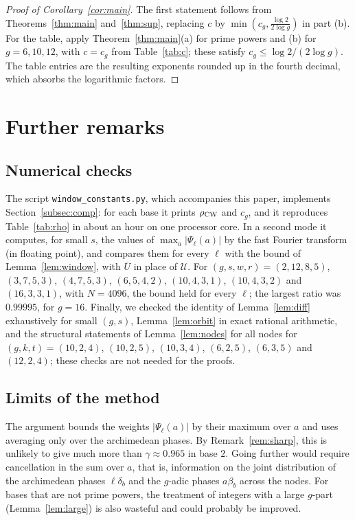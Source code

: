 \documentclass[11pt]{amsart}
\theoremstyle{definition}
\numberwithin{equation}{section}
\newcommand{\cU}{\mathcal{U}}
\begin{document}
\begin{proof}[Proof of Corollary~\ref{cor:main}]
The first statement follows from Theorems~\ref{thm:main} and~\ref{thm:sup},
replacing $c$ by $\min(c_g,\frac{\log2}{2\log g})$ in part (b). For the
table, apply Theorem~\ref{thm:main}(a) for prime powers and (b) for $g=6,10,12$,
with $c=c_g$ from Table~\ref{tab:c}; these satisfy
$c_g\le\log2/(2\log g)$. The table entries are the resulting exponents
rounded up in the fourth decimal, which absorbs the logarithmic factors.
\end{proof}

\section{Further remarks}\label{sec:remarks}

\subsection{Numerical checks}\label{subsec:checks}
The script \texttt{window\_constants.py}, which accompanies this paper,
implements Section~\ref{subsec:comp}: for each base it prints
$\rho_{\rm CW}$ and $c_g$, and it reproduces Table~\ref{tab:rho} in about
an hour on one processor core. In a second mode it computes, for
small $s$, the values of $\max_a|\Psi_\ell(a)|$ by the fast Fourier
transform (in floating point), and compares them for every $\ell$ with the bound of
Lemma~\ref{lem:window}, with $\overline U$ in place of $\cU$. For
$(g,s,w,r)=(2,12,8,5)$, $(3,7,5,3)$, $(4,7,5,3)$, $(6,5,4,2)$,
$(10,4,3,1)$, $(10,4,3,2)$ and $(16,3,3,1)$, with $N=4096$, the bound held
for every $\ell$; the largest ratio was $0.99995$, for $g=16$. Finally, we
checked
the identity of Lemma~\ref{lem:diff} exhaustively for small $(g,s)$,
Lemma~\ref{lem:orbit} in exact rational arithmetic, and the structural
statements of Lemma~\ref{lem:nodes} for all nodes for
$(g,k,t)=(10,2,4)$, $(10,2,5)$, $(10,3,4)$, $(6,2,5)$, $(6,3,5)$ and
$(12,2,4)$; these checks are not needed for the proofs.

\subsection{Limits of the method}
The argument bounds the weights $|\Psi_\ell(a)|$ by their maximum over $a$
and uses averaging only over the archimedean phases. By
Remark~\ref{rem:sharp}, this is unlikely to give much more than
$\gamma\approx0.965$ in base $2$. Going further would require cancellation in the sum over $a$,
that is, information on the joint distribution of the archimedean phases
$\ell\delta_b$ and the $g$-adic phases $a\beta_b$ across the nodes. For
bases that are not prime powers, the treatment of integers with a large $g$-part
(Lemma~\ref{lem:large}) is also wasteful and could probably be improved.
\end{document}
